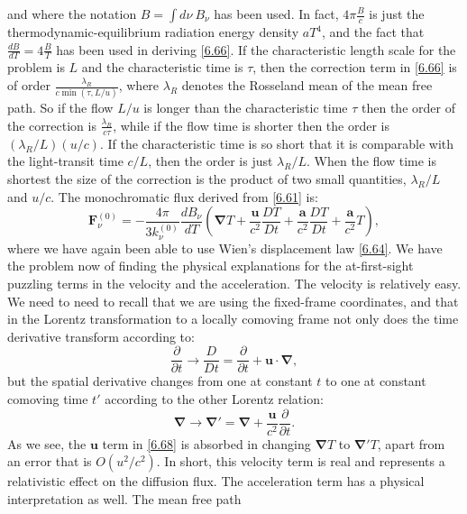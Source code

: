 \documentclass[letterpaper]{report}
\newcommand\bn{\boldsymbol{\nabla}}
\newcommand\bu{\mathbf{u}}
\newcommand\bs{\boldsymbol}
\renewcommand{\(}{\left(}
\renewcommand{\)}{\right)}
\renewcommand{\[}{\left[}
\renewcommand{\]}{\right]}
\begin{document}
and where the notation $B=\int d\nu\ B_{\nu}$ has been used. In fact, $4\pi
\frac{B}{c}$ is just the thermodynamic-equilibrium radiation energy density
$aT^4$, and the fact that $\frac{dB}{dT} = 4\frac{B}{T}$ has been used in
deriving \cref{6.66}. If the characteristic length scale for the problem is
$L$ and the characteristic time is $\tau$, then the correction term in
\cref{6.66} is of order $\frac{\lambda_R}{c\min(\tau,L/u)}$, where $\lambda_R$
denotes the Rosseland mean of the mean free path. So if the flow $L/u$ is
longer than the characteristic time $\tau$ then the order of the correction is
$\frac{\lambda_R}{c\tau}$, while if the flow time is shorter then the order is
$(\lambda_R/L)(u/c)$. If the characteristic time is so short that it is
comparable with the light-transit time $c/L$, then the order is just
$\lambda_R/L$. When the flow time is shortest the size of the correction is
the product of two small quantities, $\lambda_R/L$ and $u/c$. The
monochromatic flux derived from \cref{6.61} is:
\begin{equation}
  \bs{F}_{\nu}^{(0)}=-\frac{4\pi}{3k_{\nu}^{(0)}} \frac{dB_{\nu}}{dT} \(\bn T
  +\frac{\bu}{c^2} \frac{DT}{Dt} +\frac{\bs{a}}{c^2} \frac{DT}{Dt} +
  \frac{\bs{a}}{c^2} T\),
  \label{6.68}
\end{equation}
where we have again been able to use Wien's displacement law \cref{6.64}. We
have the problem now of finding the physical explanations for the
at-first-sight puzzling terms in the velocity and the acceleration. The
velocity is relatively easy. We need to need to recall that we are using the
fixed-frame coordinates, and that in the Lorentz transformation to a locally
comoving frame not only does the time derivative transform according to:
\begin{equation}
  \frac{\partial}{\partial t}\rightarrow \frac{D}{Dt} =
  \frac{\partial}{\partial t}+\bu\cdot\bn ,
  \label{6.69}
\end{equation}
but the spatial derivative changes from one at constant $t$ to one at constant
comoving time $t'$ according to the other Lorentz relation:
\begin{equation}
  \bn\rightarrow \bn'=\bn+\frac{\bu}{c^2}\frac{\partial}{\partial t}.
  \label{6.70}
\end{equation}
As we see, the $\bu$ term in \cref{6.68} is absorbed in changing $\bn T$ to
$\bn'T$, apart from an error that is $O(u^2/c^2)$. In short, this velocity
term is real and represents a relativistic effect on the diffusion flux. The
acceleration term has a physical interpretation as well. The mean free path
\end{document}

